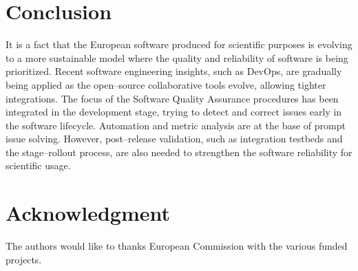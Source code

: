 \documentclass[journal]{IEEEtran}
\begin{document}
\section{Conclusion}
\label{sec:con}

It is a fact that the European software produced for scientific purposes is
evolving to a more sustainable model where the quality and reliability of
software is being prioritized. Recent software engineering insights, such as
DevOps, are gradually being applied as the open--source collaborative tools
evolve, allowing tighter integrations. The focus of the Software Quality
Assurance procedures has been integrated in the development stage, trying to
detect and correct issues early in the software lifecycle. Automation and
metric analysis are at the base of prompt issue solving. However, post--release
validation, such as integration testbeds and the stage--rollout process, are
also needed to strengthen the software reliability for scientific usage.

\section*{Acknowledgment}

The authors would like to thanks European Commission with the various funded
projects.
\end{document}
